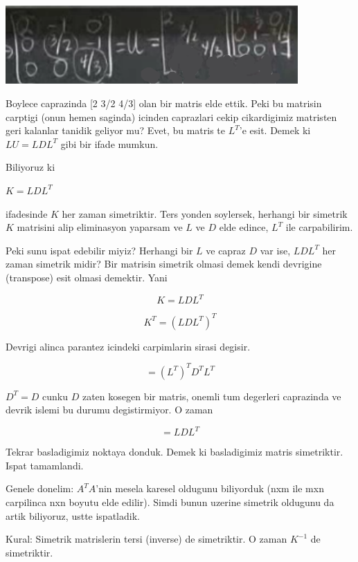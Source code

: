 \documentclass[12pt,fleqn]{article}\usepackage{../common}
\begin{document}
\includegraphics[height=3cm]{3_6.png}

Boylece caprazinda [2 3/2 4/3] olan bir matris elde ettik. Peki bu matrisin
carptigi (onun hemen saginda) icinden caprazlari cekip cikardigimiz
matristen geri kalanlar tanidik geliyor mu? Evet, bu matris te $L^T$'e
esit. Demek ki $LU = LDL^T$ gibi bir ifade mumkun.

Biliyoruz ki 

$K = LDL^T$

ifadesinde $K$ her zaman simetriktir. Ters yonden soylersek, herhangi bir
simetrik $K$ matrisini alip eliminasyon yaparsam ve $L$ ve $D$ elde edince,
$L^T$ ile carpabilirim. 

Peki sunu ispat edebilir miyiz? Herhangi bir $L$ ve capraz $D$ var ise,
$LDL^T$ her zaman simetrik midir? Bir matrisin simetrik olmasi demek
kendi devrigine (transpose) esit olmasi demektir. Yani 

\[ K = LDL^T \]

\[ K^T = (LDL^T)^T \]

Devrigi alinca parantez icindeki carpimlarin sirasi degisir.

\[ = (L^T)^TD^TL^T \]

$D^T = D$ cunku $D$ zaten kosegen bir matris, onemli tum degerleri
caprazinda ve devrik islemi bu durumu degistirmiyor. O zaman

\[ = LDL^T \]

Tekrar basladigimiz noktaya donduk. Demek ki basladigimiz matris
simetriktir. Ispat tamamlandi. 

Genele donelim: $A^TA$'nin mesela karesel oldugunu biliyorduk (nxm ile mxn
carpilinca nxn boyutu elde edilir). Simdi bunun uzerine simetrik oldugunu
da artik biliyoruz, ustte ispatladik.

Kural: Simetrik matrislerin tersi (inverse) de simetriktir. O zaman
$K^{-1}$ de simetriktir. 
\end{document}
